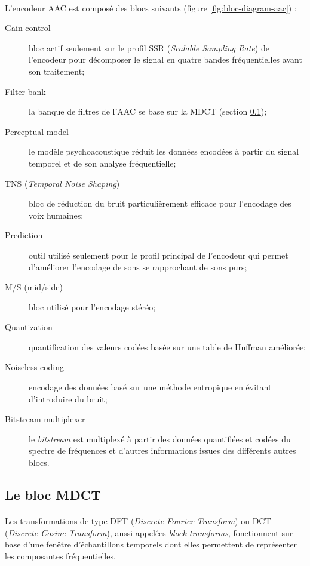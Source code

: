 \documentclass{article}
\begin{document}
    \paragraph{}
    L'encodeur AAC est composé des blocs suivants (figure \ref{fig:bloc-diagram-aac})\cite{1999-Brandenburg} :
    \begin{description}
        \item[Gain control] bloc actif seulement sur le profil SSR (\emph{Scalable Sampling Rate}) de l'encodeur pour décomposer le signal en quatre bandes fréquentielles avant son traitement;
        \item[Filter bank] la banque de filtres de l'AAC se base sur la MDCT (section \ref{sec:mdct});
        \item[Perceptual model] le modèle psychoacoustique réduit les données encodées à partir du signal temporel et de son analyse fréquentielle;
        \item[TNS (\emph{Temporal Noise Shaping})] bloc de réduction du bruit particulièrement efficace pour l'encodage des voix humaines;
        \item[Prediction] outil utilisé seulement pour le profil principal de l'encodeur qui permet d'améliorer l'encodage de sons se rapprochant de sons purs;
        \item[M/S (mid/side)] bloc utilisé pour l'encodage stéréo;
        \item[Quantization] quantification des valeurs codées basée sur une table de Huffman améliorée;
        \item[Noiseless coding] encodage des données basé sur une méthode entropique en évitant d'introduire du bruit;
        \item[Bitstream multiplexer] le \emph{bitstream} est multiplexé à partir des données quantifiées et codées du spectre de fréquences et d'autres informations issues des différents autres blocs.
    \end{description}


    \subsection{Le bloc MDCT}
    \label{sec:mdct}
    \paragraph{}
    Les transformations de type DFT (\emph{Discrete Fourier Transform}) ou DCT (\emph{Discrete Cosine Transform}), aussi appelées \emph{block transforms}, fonctionnent sur base d'une fenêtre d'échantillons temporels dont elles permettent de représenter les composantes fréquentielles\cite{wiki:MDCT}.
\end{document}
